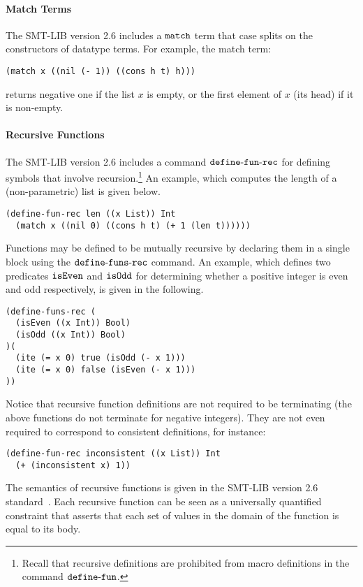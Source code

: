 \documentclass[english,a4paper,10pt]{article}
\begin{document}
\begin{appendix}
\paragraph{Match Terms}
The SMT-LIB version 2.6 includes a ${\tt match}$ term
that case splits on the constructors of datatype terms.
For example,
the match term:
\begin{lstlisting}[basicstyle={\ttfamily}]
(match x ((nil (- 1)) ((cons h t) h)))
\end{lstlisting}
returns negative one if the list $x$ is empty,
or the first element of $x$ (its head) if it is non-empty.

\paragraph{Recursive Functions}
The SMT-LIB version 2.6 includes a command ${\tt define\mbox{-}fun\mbox{-}rec}$
for defining symbols that involve recursion.\footnote{
Recall that recursive definitions are prohibited from macro definitions in the command
${\tt define\mbox{-}fun}$.
}
An example, which computes the length of a (non-parametric) list 
is given below.
\begin{lstlisting}[basicstyle={\ttfamily}]
(define-fun-rec len ((x List)) Int 
  (match x ((nil 0) ((cons h t) (+ 1 (len t))))))
\end{lstlisting}
Functions may be defined to be mutually recursive by declaring
them in a single block using the ${\tt define\mbox{-}funs\mbox{-}rec}$ command.
An example, which defines two predicates ${\tt isEven}$ and ${\tt isOdd}$
for determining whether a positive integer is even and odd respectively,
is given in the following.
\begin{lstlisting}[basicstyle={\ttfamily}]
(define-funs-rec (
  (isEven ((x Int)) Bool)
  (isOdd ((x Int)) Bool)
)(
  (ite (= x 0) true (isOdd (- x 1)))
  (ite (= x 0) false (isEven (- x 1)))
))
\end{lstlisting}
Notice that recursive function definitions are not required to be terminating
(the above functions do not terminate for negative integers).
They are not even required to correspond to consistent definitions, for instance:
\begin{lstlisting}[basicstyle={\ttfamily}]
(define-fun-rec inconsistent ((x List)) Int 
  (+ (inconsistent x) 1))
\end{lstlisting}
The semantics of recursive functions is given in 
the SMT-LIB version 2.6 standard~\cite{BarFT-RR-17}.
Each recursive function can be seen as a universally quantified constraint
that asserts that each set of values in the domain of the function
is equal to its body.


\end{appendix}
\end{document}
